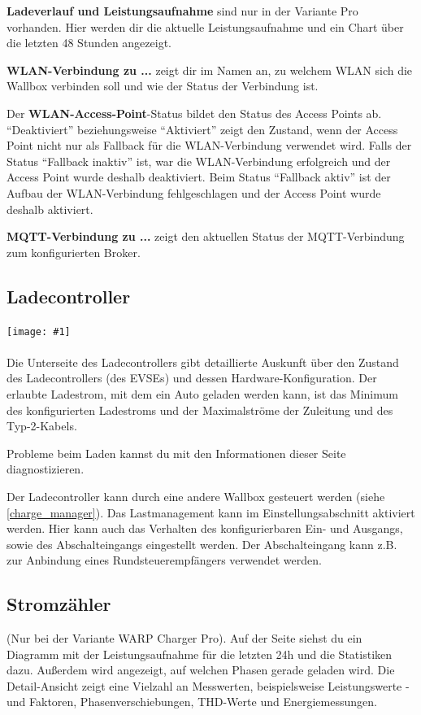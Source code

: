 \documentclass[a4paper,10pt]{article}
\newcommand{\gfx}[1]{\texttt{[image: \#1]}}
\begin{document}
\begin{multicols*}{2}
	\textbf{Ladeverlauf und Leistungsaufnahme} sind nur in der Variante Pro
	vorhanden. Hier werden dir die aktuelle Leistungsaufnahme und ein Chart über
	die letzten 48 Stunden angezeigt.

	\textbf{WLAN-Verbindung zu ...} zeigt dir im Namen an, zu welchem WLAN
	sich die Wallbox verbinden soll und wie der Status der Verbindung ist.

	Der \textbf{WLAN-Access-Point}-Status bildet den Status des Access Points ab.
	\enquote{Deaktiviert} beziehungsweise \enquote{Aktiviert} zeigt den Zustand, wenn der Access Point nicht
	nur als Fallback für die WLAN-Verbindung verwendet wird. Falls der Status \enquote{Fallback inaktiv} ist,
	war die WLAN-Verbindung erfolgreich und der Access Point wurde deshalb deaktiviert.
	Beim Status \enquote{Fallback aktiv} ist der Aufbau der WLAN-Verbindung fehlgeschlagen und der
	Access Point wurde deshalb aktiviert.

	\textbf{MQTT-Verbindung zu ...} zeigt den aktuellen Status der MQTT-Verbindung
	zum konfigurierten Broker.

	\subsection{Ladecontroller}
	\gfx{./img_warp2/resized/web_evse2}
	\\\\
	Die Unterseite des Ladecontrollers gibt detaillierte Auskunft über den Zustand
	des Ladecontrollers (des EVSEs) und dessen Hardware-Konfiguration. Der
	erlaubte Ladestrom, mit dem ein Auto geladen werden kann, ist das Minimum des
	konfigurierten Ladestroms und der Maximalströme der Zuleitung und des Typ-2-Kabels.

	Probleme beim Laden kannst du mit den Informationen dieser
	Seite diagnostizieren.

	Der Ladecontroller kann durch eine andere Wallbox gesteuert werden (siehe \ref{charge_manager}).
	Das Lastmanagement kann im Einstellungsabschnitt aktiviert werden. Hier kann auch das Verhalten des
	konfigurierbaren Ein- und Ausgangs, sowie des Abschalteingangs eingestellt werden. Der Abschalteingang
	kann z.B. zur Anbindung eines Rundsteuerempfängers verwendet werden.

	\subsection{Stromzähler}
	(Nur bei der Variante WARP Charger Pro). Auf der Seite
	siehst du ein Diagramm mit der Leistungsaufnahme für die letzten 24h und die
	Statistiken dazu. Außerdem wird angezeigt, auf welchen Phasen gerade geladen wird.
	Die Detail-Ansicht zeigt eine Vielzahl an Messwerten, beispielsweise Leistungswerte -und Faktoren,
	Phasenverschiebungen, THD-Werte und Energiemessungen.


\end{multicols*}
\end{document}
